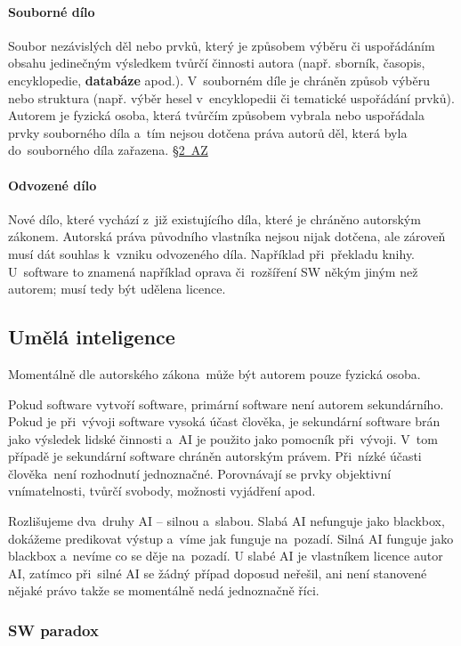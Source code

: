 \paragraph{Souborné dílo} Soubor nezávislých děl nebo prvků, který je způsobem výběru či uspořádáním obsahu jedinečným výsledkem tvůrčí činnosti autora (např. sborník, časopis, encyklopedie, \textbf{databáze} apod.). V~souborném díle je chráněn způsob výběru nebo struktura (např. výběr hesel v~encyklopedii či tematické uspořádání prvků). Autorem je fyzická osoba, která tvůrčím způsobem vybrala nebo uspořádala prvky souborného díla a~tím nejsou dotčena práva autorů děl, která byla do~souborného díla zařazena. \href{https://www.zakonyprolidi.cz/cs/2000-121#p2}{§2~AZ}

\paragraph{Odvozené dílo} Nové dílo, které vychází z~již existujícího díla, které je chráněno autorským zákonem. Autorská práva původního vlastníka nejsou nijak dotčena, ale zároveň musí dát souhlas k~vzniku odvozeného díla. Například při~překladu knihy. U~software to znamená například oprava či~rozšíření SW někým jiným než autorem; musí tedy být udělena licence.

\needspace{3cm}
\subsection{Umělá inteligence}

Momentálně dle autorského zákona~může být autorem pouze fyzická osoba.

Pokud software vytvoří software, primární software není autorem sekundárního. Pokud je při~vývoji software vysoká účast člověka, je sekundární software brán jako výsledek lidské činnosti a~AI je použito jako pomocník při~vývoji. V~tom případě je sekundární software chráněn autorským právem. Při~nízké účasti člověka~není rozhodnutí jednoznačné. Porovnávají se prvky objektivní vnímatelnosti, tvůrčí svobody, možnosti vyjádření apod.

Rozlišujeme dva~druhy AI -- silnou a~slabou. Slabá AI nefunguje jako blackbox, dokážeme predikovat výstup a~víme jak funguje na~pozadí. Silná AI funguje jako blackbox a~nevíme co se děje na~pozadí. U slabé AI je vlastníkem licence autor AI, zatímco při~silné AI se žádný případ doposud neřešil, ani není stanovené nějaké právo takže se momentálně nedá jednoznačně říci.

\subsubsection{SW paradox}

